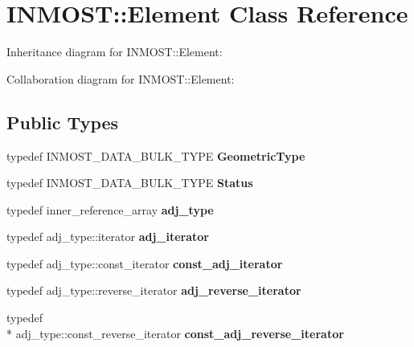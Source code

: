 \hypertarget{classINMOST_1_1Element}{\section{I\-N\-M\-O\-S\-T\-:\-:Element Class Reference}
\label{classINMOST_1_1Element}
}


Inheritance diagram for I\-N\-M\-O\-S\-T\-:\-:Element\-:


Collaboration diagram for I\-N\-M\-O\-S\-T\-:\-:Element\-:
\subsection*{Public Types}
\begin{DoxyCompactItemize}
\item 
\hypertarget{classINMOST_1_1Element_a67ac235d4dcb5a949fa9150d5b82ebd8}{typedef I\-N\-M\-O\-S\-T\-\_\-\-D\-A\-T\-A\-\_\-\-B\-U\-L\-K\-\_\-\-T\-Y\-P\-E {\bfseries Geometric\-Type}}\label{classINMOST_1_1Element_a67ac235d4dcb5a949fa9150d5b82ebd8}

\item 
\hypertarget{classINMOST_1_1Element_ac872af2720bbc9dcf55ec63eb09c639b}{typedef I\-N\-M\-O\-S\-T\-\_\-\-D\-A\-T\-A\-\_\-\-B\-U\-L\-K\-\_\-\-T\-Y\-P\-E {\bfseries Status}}\label{classINMOST_1_1Element_ac872af2720bbc9dcf55ec63eb09c639b}

\item 
\hypertarget{classINMOST_1_1Element_aff536a514195ba59e540455bdf40fd14}{typedef inner\-\_\-reference\-\_\-array {\bfseries adj\-\_\-type}}\label{classINMOST_1_1Element_aff536a514195ba59e540455bdf40fd14}

\item 
\hypertarget{classINMOST_1_1Element_ae98d7bc1b7117dbf5ec2509138cfb610}{typedef adj\-\_\-type\-::iterator {\bfseries adj\-\_\-iterator}}\label{classINMOST_1_1Element_ae98d7bc1b7117dbf5ec2509138cfb610}

\item 
\hypertarget{classINMOST_1_1Element_a493993dcd759b29914bacee2343c099e}{typedef adj\-\_\-type\-::const\-\_\-iterator {\bfseries const\-\_\-adj\-\_\-iterator}}\label{classINMOST_1_1Element_a493993dcd759b29914bacee2343c099e}

\item 
\hypertarget{classINMOST_1_1Element_a3e3c89f0d9aa578dedb07060046da74e}{typedef adj\-\_\-type\-::reverse\-\_\-iterator {\bfseries adj\-\_\-reverse\-\_\-iterator}}\label{classINMOST_1_1Element_a3e3c89f0d9aa578dedb07060046da74e}

\item 
\hypertarget{classINMOST_1_1Element_a2212e3f149d9dab8ae5e918b9f6942ad}{typedef \\*
adj\-\_\-type\-::const\-\_\-reverse\-\_\-iterator {\bfseries const\-\_\-adj\-\_\-reverse\-\_\-iterator}}\label{classINMOST_1_1Element_a2212e3f149d9dab8ae5e918b9f6942ad}

\end{DoxyCompactItemize}
